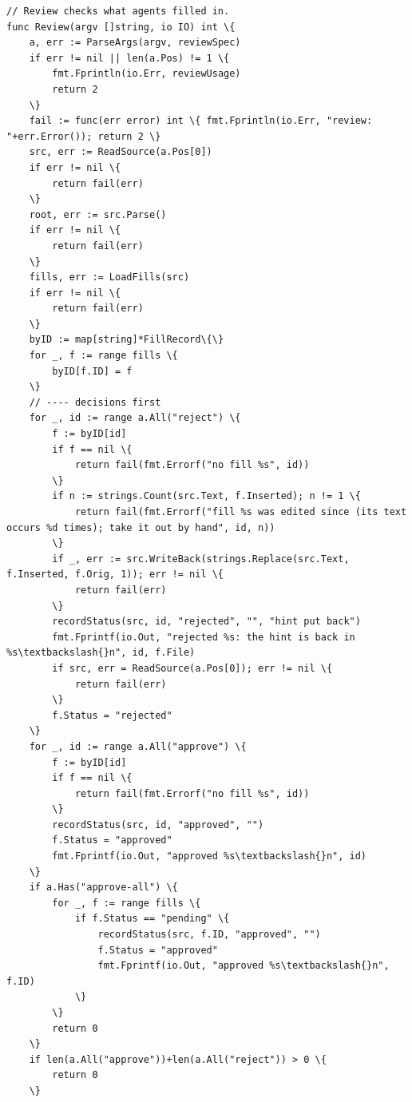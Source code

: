 \documentclass[10pt,a4paper]{article}
\begin{document}
\begin{Verbatim}
// Review checks what agents filled in.
func Review(argv []string, io IO) int \{
	a, err := ParseArgs(argv, reviewSpec)
	if err != nil || len(a.Pos) != 1 \{
		fmt.Fprintln(io.Err, reviewUsage)
		return 2
	\}
	fail := func(err error) int \{ fmt.Fprintln(io.Err, "review: "+err.Error()); return 2 \}
	src, err := ReadSource(a.Pos[0])
	if err != nil \{
		return fail(err)
	\}
	root, err := src.Parse()
	if err != nil \{
		return fail(err)
	\}
	fills, err := LoadFills(src)
	if err != nil \{
		return fail(err)
	\}
	byID := map[string]*FillRecord\{\}
	for _, f := range fills \{
		byID[f.ID] = f
	\}
	// ---- decisions first
	for _, id := range a.All("reject") \{
		f := byID[id]
		if f == nil \{
			return fail(fmt.Errorf("no fill %s", id))
		\}
		if n := strings.Count(src.Text, f.Inserted); n != 1 \{
			return fail(fmt.Errorf("fill %s was edited since (its text occurs %d times); take it out by hand", id, n))
		\}
		if _, err := src.WriteBack(strings.Replace(src.Text, f.Inserted, f.Orig, 1)); err != nil \{
			return fail(err)
		\}
		recordStatus(src, id, "rejected", "", "hint put back")
		fmt.Fprintf(io.Out, "rejected %s: the hint is back in %s\textbackslash{}n", id, f.File)
		if src, err = ReadSource(a.Pos[0]); err != nil \{
			return fail(err)
		\}
		f.Status = "rejected"
	\}
	for _, id := range a.All("approve") \{
		f := byID[id]
		if f == nil \{
			return fail(fmt.Errorf("no fill %s", id))
		\}
		recordStatus(src, id, "approved", "")
		f.Status = "approved"
		fmt.Fprintf(io.Out, "approved %s\textbackslash{}n", id)
	\}
	if a.Has("approve-all") \{
		for _, f := range fills \{
			if f.Status == "pending" \{
				recordStatus(src, f.ID, "approved", "")
				f.Status = "approved"
				fmt.Fprintf(io.Out, "approved %s\textbackslash{}n", f.ID)
			\}
		\}
		return 0
	\}
	if len(a.All("approve"))+len(a.All("reject")) > 0 \{
		return 0
	\}


\end{Verbatim}
\end{document}
